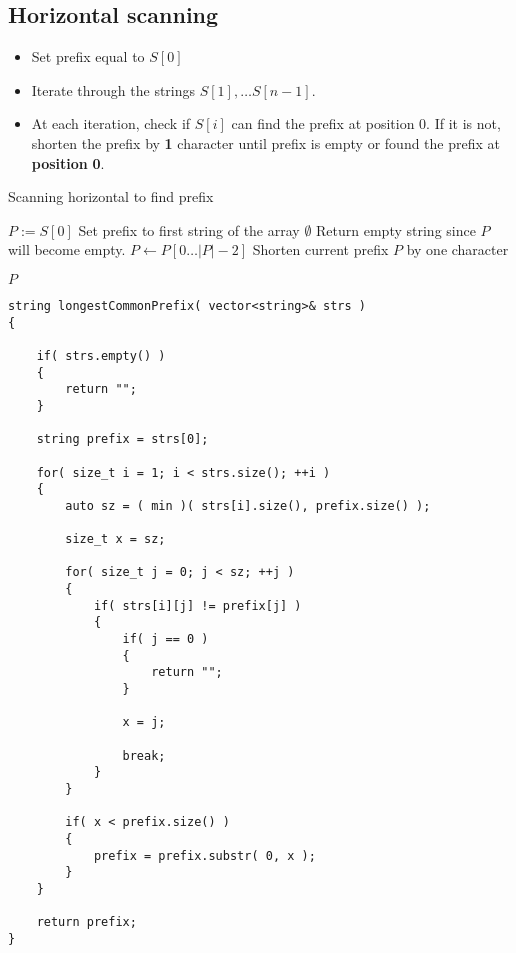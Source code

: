\subsection{Horizontal scanning}
\begin{itemize}
\item Set prefix equal to $S[0]$
\item Iterate through the strings $S[1],\ldots S[n-1]$.
\item At each iteration, check if $S[i]$ can find the prefix at position 0. If it is not, {\color{red}shorten} the prefix by \textbf{\color{red}1} character until prefix is empty or found the prefix at \textbf{position} \textbf{\color{red}0}.
\end{itemize}
\setcounter{algorithm}{0}
\begin{algorithm}[H]
\caption{Scanning horizontal to find prefix}
\begin{algorithmic}[1]
\State $P := S[0]$ \Comment Set prefix to first string of the array
\State \Return $\emptyset$ \Comment Return empty string since $P$ will become empty.
\EndIf
\State $P\gets P[0\ldots \lvert P\rvert-2]$ \Comment Shorten current prefix $P$ by one character
\EndWhile
		\end{algorithmic}
	\end{algorithm}
\begin{algorithm}[H]
	\begin{algorithmic}[1]
		\EndFor
\State \Return $P$
\EndProcedure
\end{algorithmic}
\end{algorithm}
\setcounter{lstlisting}{0}
\begin{lstlisting}[style=customc, caption={Horizontal scanning}]
string longestCommonPrefix( vector<string>& strs )
{

    if( strs.empty() )
    {
        return "";
    }

    string prefix = strs[0];

    for( size_t i = 1; i < strs.size(); ++i )
    {
        auto sz = ( min )( strs[i].size(), prefix.size() );

        size_t x = sz;

        for( size_t j = 0; j < sz; ++j )
        {
            if( strs[i][j] != prefix[j] )
            {
                if( j == 0 )
                {
                    return "";
                }

                x = j;

                break;
            }
        }

        if( x < prefix.size() )
        {
            prefix = prefix.substr( 0, x );
        }
    }

    return prefix;
}
\end{lstlisting}

